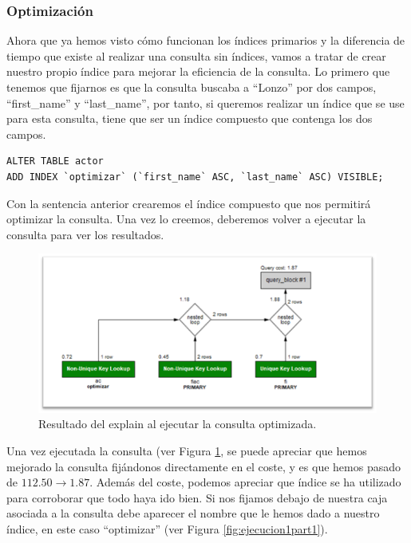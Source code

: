 \documentclass[a4paper]{article}
\begin{document}
\subsubsection*{Optimización}

Ahora que ya hemos visto cómo funcionan los índices primarios y la diferencia de tiempo que existe al realizar una consulta sin índices, vamos a tratar de crear nuestro propio índice para mejorar la eficiencia de la consulta. Lo primero que tenemos que fijarnos es que la consulta buscaba a ``Lonzo'' por dos campos, ``first\_name'' y ``last\_name'', por tanto, si queremos realizar un índice que se use para esta consulta, tiene que ser un índice compuesto que contenga los dos campos.

\begin{verbatim}
ALTER TABLE actor
ADD INDEX `optimizar` (`first_name` ASC, `last_name` ASC) VISIBLE;
\end{verbatim}

Con la sentencia anterior crearemos el índice compuesto que nos permitirá optimizar la consulta. Una vez lo creemos, deberemos volver a ejecutar la consulta para ver los resultados.

\begin{figure}[ht]
    \centering
    \includegraphics[width=0.8\columnwidth]{figs/ejecucion1optimizada.png}
    \caption{Resultado del explain al ejecutar la consulta optimizada.}\label{fig:ejecucion1optimizada}
\end{figure}

Una vez ejecutada la consulta (ver Figura \ref{fig:ejecucion1optimizada}, se puede apreciar que hemos mejorado la consulta fijándonos directamente en el coste, y es que hemos pasado de $112.50 \rightarrow 1.87$. Además del coste, podemos apreciar que índice se ha utilizado para corroborar que todo haya ido bien. Si nos fijamos debajo de nuestra caja asociada a la consulta debe aparecer el nombre que le hemos dado a nuestro índice, en este caso ``optimizar'' (ver Figura \ref{fig:ejecucion1part1}).
\end{document}
